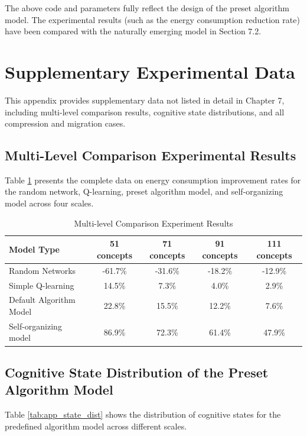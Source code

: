 \documentclass[10pt,onecolumn]{article}
\begin{document}
The above code and parameters fully reflect the design of the preset algorithm model. The experimental results (such as the energy consumption reduction rate) have been compared with the naturally emerging model in Section 7.2.

\section{Supplementary Experimental Data}
\label{app:supplementary_data}

This appendix provides supplementary data not listed in detail in Chapter 7, including multi-level comparison results, cognitive state distributions, and all compression and migration cases.

\subsection{Multi-Level Comparison Experimental Results}

Table \ref{tab:app_multi_comparison} presents the complete data on energy consumption improvement rates for the random network, Q-learning, preset algorithm model, and self-organizing model across four scales.

\begin{table}[H]
\footnotesize
\centering
\caption{Multi-level Comparison Experiment Results}
\label{tab:app_multi_comparison}
\begin{tabular}{lcccc}
\toprule
\textbf{Model Type} & \textbf{51 concepts} & \textbf{71 concepts} & \textbf{91 concepts} & \textbf{111 concepts} \\
\midrule
Random Networks & -61.7\% & -31.6\% & -18.2\% & -12.9\% \\
Simple Q-learning & 14.5\% & 7.3\% & 4.0\% & 2.9\% \\
Default Algorithm Model & 22.8\% & 15.5\% & 12.2\% & 7.6\% \\
Self-organizing model & 86.9\% & 72.3\% & 61.4\% & 47.9\% \\
\bottomrule
\end{tabular}
\end{table}

\subsection{Cognitive State Distribution of the Preset Algorithm Model}

Table \ref{tab:app_state_dist} shows the distribution of cognitive states for the predefined algorithm model across different scales.
\end{document}

